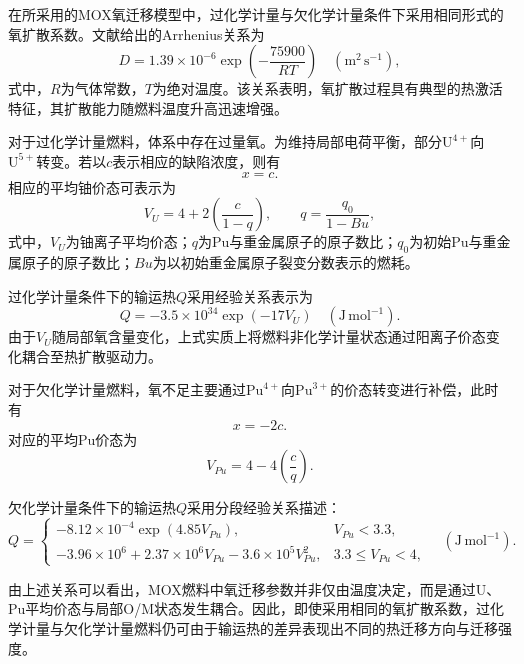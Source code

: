 在所采用的MOX氧迁移模型中，过化学计量与欠化学计量条件下采用相同形式的氧扩散系数。文献给出的Arrhenius关系为
\begin{equation}
	D
	=
	1.39\times10^{-6}
	\exp\left(
	-\frac{75900}{RT}
	\right)
	\quad
	\left(\mathrm{m^2\,s^{-1}}\right),
\end{equation}
式中，$R$为气体常数，$T$为绝对温度。该关系表明，氧扩散过程具有典型的热激活特征，其扩散能力随燃料温度升高迅速增强。

对于过化学计量燃料，体系中存在过量氧。为维持局部电荷平衡，部分$\mathrm{U}^{4+}$向$\mathrm{U}^{5+}$转变。若以$c$表示相应的缺陷浓度，则有
\begin{equation}
	x=c .
\end{equation}
相应的平均铀价态可表示为
\begin{equation}
	V_U
	=
	4+
	2\left(
	\frac{c}{1-q}
	\right),
	\qquad
	q=\frac{q_0}{1-Bu},
\end{equation}
式中，$V_U$为铀离子平均价态；$q$为Pu与重金属原子的原子数比；$q_0$为初始Pu与重金属原子的原子数比；$Bu$为以初始重金属原子裂变分数表示的燃耗。

过化学计量条件下的输运热$Q$采用经验关系表示为
\begin{equation}
	Q
	=
	-3.5\times10^{34}
	\exp\left(-17V_U\right)
	\quad
	\left(\mathrm{J\,mol^{-1}}\right).
\end{equation}
由于$V_U$随局部氧含量变化，上式实质上将燃料非化学计量状态通过阳离子价态变化耦合至热扩散驱动力。

对于欠化学计量燃料，氧不足主要通过$\mathrm{Pu}^{4+}$向$\mathrm{Pu}^{3+}$的价态转变进行补偿，此时有
\begin{equation}
	x=-2c .
\end{equation}
对应的平均Pu价态为
\begin{equation}
	V_{Pu}
	=
	4-
	4\left(
	\frac{c}{q}
	\right).
\end{equation}

欠化学计量条件下的输运热$Q$采用分段经验关系描述：
\begin{equation}
	Q=
	\begin{cases}
		-8.12\times10^{-4}
		\exp\left(4.85V_{Pu}\right),
		& V_{Pu}<3.3, \\[6pt]
		-3.96\times10^{6}
		+
		2.37\times10^{6}V_{Pu}
		-
		3.6\times10^{5}V_{Pu}^{2},
		& 3.3\leq V_{Pu}<4,
	\end{cases}
	\quad
	\left(\mathrm{J\,mol^{-1}}\right).
\end{equation}

由上述关系可以看出，MOX燃料中氧迁移参数并非仅由温度决定，而是通过U、Pu平均价态与局部O/M状态发生耦合。因此，即使采用相同的氧扩散系数，过化学计量与欠化学计量燃料仍可由于输运热的差异表现出不同的热迁移方向与迁移强度。


